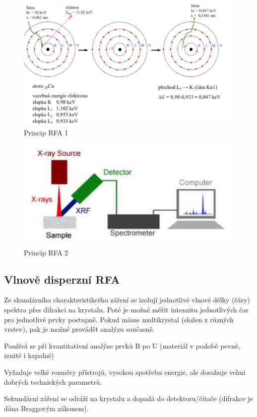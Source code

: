 \begin{figure}[H]
    \centering
    \includegraphics[width=0.9\linewidth]{img/Princip RFA 1.png}
    \caption{Princip RFA 1}
\end{figure}

\begin{figure}[H]
    \centering
    \includegraphics[width=0.7\linewidth]{img/Princip RFA 2.png}
    \caption{Princip RFA 2}
\end{figure}

\subsection{Vlnově disperzní RFA}

Ze skundárního charakteristikcého záření se izolují jednotlivé vlnové délky (čáry) spektra přes difrakci na krystalu. Poté je možné měřit intenzitu jednotlivých čar pro jednotlivé prvky postupně. Pokud máme multikrystal (složen z různých vrstev), pak je možné provádět analýzu současně.

Používá se při kvantitativní analýze prvků B po U (materiál v podobě pevné, zrnité i kapalné)

Vyžaduje velké rozměry přístrojů, vysokou spotřebu energie, ale dosahuje velmi dobrých technických parametrů.

Sekundární záření se odráží na krystalu a dopadá do detektoru/čítače (difrakce je dána Braggovým zákonem).

